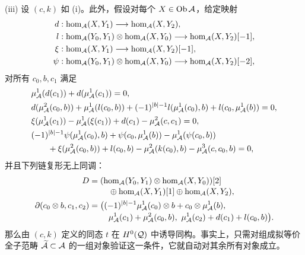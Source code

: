 \begin{lemma}
\textup{(iii)} 设 $(c,k)$ 如 \textup{(i)}。此外，假设对每个 $X\in\operatorname{Ob}\mathcal A$，给定映射
\[
\begin{aligned}
d&:\hom_{\mathcal A}(X,Y_1)\longrightarrow\hom_{\mathcal A}(X,Y_2),\\
l&:\hom_{\mathcal A}(Y_0,Y_1)\otimes\hom_{\mathcal A}(X,Y_0)\longrightarrow\hom_{\mathcal A}(X,Y_2)[-1],\\
\xi&:\hom_{\mathcal A}(X,Y_1)\longrightarrow\hom_{\mathcal A}(X,Y_2)[-1],\\
\psi&:\hom_{\mathcal A}(Y_0,Y_1)\otimes\hom_{\mathcal A}(X,Y_0)\longrightarrow\hom_{\mathcal A}(X,Y_2)[-2],
\end{aligned}
\]
对所有 $c_0,b,c_1$ 满足
\begin{align*}
&\mu^1_{\mathcal A}(d(c_1))+d(\mu^1_{\mathcal A}(c_1))=0,\\
&d(\mu^2_{\mathcal A}(c_0,b))+\mu^1_{\mathcal A}(l(c_0,b))+(-1)^{|b|-1}l(\mu^1_{\mathcal A}(c_0),b)+l(c_0,\mu^1_{\mathcal A}(b))=0,\\
&\xi(\mu^1_{\mathcal A}(c_1))-\mu^1_{\mathcal A}(\xi(c_1))+d(c_1)-\mu^2_{\mathcal A}(c,c_1)=0,\\
&(-1)^{|b|-1}\psi(\mu^1_{\mathcal A}(c_0),b)+\psi(c_0,\mu^1_{\mathcal A}(b))-\mu^1_{\mathcal A}(\psi(c_0,b))\\
&\qquad+\xi(\mu^2_{\mathcal A}(c_0,b))+l(c_0,b)-\mu^2_{\mathcal A}(k(c_0),b)-\mu^3_{\mathcal A}(c,c_0,b)=0,
\end{align*}
并且下列链复形无上同调：
\begin{equation}\label{eq:5.8}
\begin{aligned}
D={}&(\hom_{\A}(Y_0,Y_1)\otimes\hom_{\A}(X,Y_0))[2]\\[-2pt]
&\quad\oplus\hom_{\A}(X,Y_1)[1]\oplus\hom_{\A}(X,Y_2),\\
\partial(c_0\otimes b,c_1,c_2)={}&\bigl((-1)^{|b|-1}\mu^1_{\A}(c_0)\otimes b+c_0\otimes\mu^1_{\A}(b),\\[-2pt]
&\quad\mu^1_{\A}(c_1)+\mu^2_{\A}(c_0,b),\ \mu^1_{\A}(c_2)+d(c_1)+l(c_0,b)\bigr).
\end{aligned}
\end{equation}
那么由 $(c,k)$ 定义的同态 $t$ 在 $H^0(\mathcal Q)$ 中诱导同构。事实上，只需对组成拟等价全子范畴 $\widetilde{\mathcal A}\subset\mathcal A$ 的一组对象验证这一条件，它就自动对其余所有对象成立。
\end{lemma}
